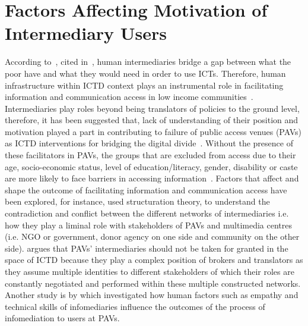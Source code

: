 \section{Factors Affecting Motivation of Intermediary Users}
According to~\cite{heeks1999tyranny}, cited in~\cite{bailur2012complex}, human intermediaries bridge a gap between what the poor have and what they would need in order to use ICTs. Therefore, human infrastructure within ICTD context plays an instrumental role in facilitating information and communication access in low income communities~\citep{sambasivan2010human}. Intermediaries play roles beyond being translators of policies to the ground level, therefore, it has been suggested that, lack of understanding of their position and motivation played a part in contributing to failure of public access venues (PAVs) as ICTD interventions for bridging the digital divide~\citep{bailur2010liminal}. Without the presence of these facilitators in PAVs, the groups that are excluded from access due to their age, socio-economic status, level of education/literacy, gender, disability or caste are more likely to face barriers in accessing information~\citep{ramirez2013infomediaries}. Factors that affect and shape the outcome of facilitating information and communication access have been explored, for instance, \cite{bailur2010liminal} used structuration theory\citep{jones2008giddens}, to understand the contradiction and conflict between the different networks of intermediaries i.e. how they play a liminal role with stakeholders of PAVs and multimedia centres (i.e. NGO or government, donor agency on one side and community on the other side). \cite{bailur2012complex} argues that PAVs' intermediaries should not be taken for granted in the space of ICTD because they play a complex position of brokers and translators as they assume multiple identities to different stakeholders of which their roles are constantly negotiated and performed within these multiple constructed networks. Another study is by \cite{ramirez2013infomediaries} which investigated how human factors such as empathy and technical skills of infomediaries influence the outcomes of the process of infomediation to users at PAVs. 

